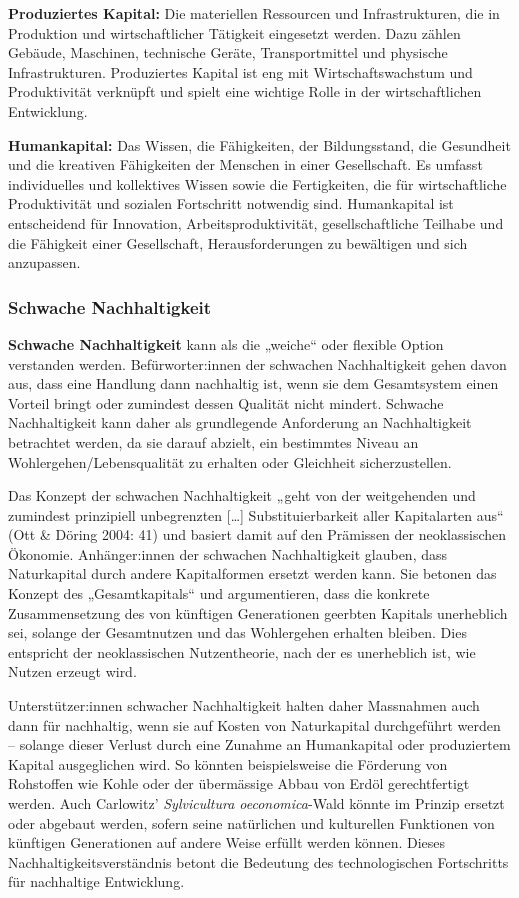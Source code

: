 \documentclass[
  letterpaper,
  DIV=11,
  numbers=noendperiod]{scrartcl}
\begin{document}
\textbf{Produziertes Kapital:} Die materiellen Ressourcen und
Infrastrukturen, die in Produktion und wirtschaftlicher Tätigkeit
eingesetzt werden. Dazu zählen Gebäude, Maschinen, technische Geräte,
Transportmittel und physische Infrastrukturen. Produziertes Kapital ist
eng mit Wirtschaftswachstum und Produktivität verknüpft und spielt eine
wichtige Rolle in der wirtschaftlichen Entwicklung.

\textbf{Humankapital:} Das Wissen, die Fähigkeiten, der Bildungsstand,
die Gesundheit und die kreativen Fähigkeiten der Menschen in einer
Gesellschaft. Es umfasst individuelles und kollektives Wissen sowie die
Fertigkeiten, die für wirtschaftliche Produktivität und sozialen
Fortschritt notwendig sind. Humankapital ist entscheidend für
Innovation, Arbeitsproduktivität, gesellschaftliche Teilhabe und die
Fähigkeit einer Gesellschaft, Herausforderungen zu bewältigen und sich
anzupassen.

\subsubsection{Schwache Nachhaltigkeit}\label{schwache-nachhaltigkeit}

\textbf{Schwache Nachhaltigkeit} kann als die „weiche`` oder flexible
Option verstanden werden. Befürworter:innen der schwachen Nachhaltigkeit
gehen davon aus, dass eine Handlung dann nachhaltig ist, wenn sie dem
Gesamtsystem einen Vorteil bringt oder zumindest dessen Qualität nicht
mindert. Schwache Nachhaltigkeit kann daher als grundlegende Anforderung
an Nachhaltigkeit betrachtet werden, da sie darauf abzielt, ein
bestimmtes Niveau an Wohlergehen/Lebensqualität zu erhalten oder
Gleichheit sicherzustellen.

Das Konzept der schwachen Nachhaltigkeit „geht von der weitgehenden und
zumindest prinzipiell unbegrenzten {[}\ldots{]} Substituierbarkeit aller
Kapitalarten aus`` (Ott \& Döring 2004: 41) und basiert damit auf den
Prämissen der neoklassischen Ökonomie. Anhänger:innen der schwachen
Nachhaltigkeit glauben, dass Naturkapital durch andere Kapitalformen
ersetzt werden kann. Sie betonen das Konzept des „Gesamtkapitals`` und
argumentieren, dass die konkrete Zusammensetzung des von künftigen
Generationen geerbten Kapitals unerheblich sei, solange der Gesamtnutzen
und das Wohlergehen erhalten bleiben. Dies entspricht der neoklassischen
Nutzentheorie, nach der es unerheblich ist, wie Nutzen erzeugt wird.

Unterstützer:innen schwacher Nachhaltigkeit halten daher Massnahmen auch
dann für nachhaltig, wenn sie auf Kosten von Naturkapital durchgeführt
werden -- solange dieser Verlust durch eine Zunahme an Humankapital oder
produziertem Kapital ausgeglichen wird. So könnten beispielsweise die
Förderung von Rohstoffen wie Kohle oder der übermässige Abbau von Erdöl
gerechtfertigt werden. Auch Carlowitz' \emph{Sylvicultura
oeconomica}-Wald könnte im Prinzip ersetzt oder abgebaut werden, sofern
seine natürlichen und kulturellen Funktionen von künftigen Generationen
auf andere Weise erfüllt werden können. Dieses
Nachhaltigkeitsverständnis betont die Bedeutung des technologischen
Fortschritts für nachhaltige Entwicklung.
\end{document}
